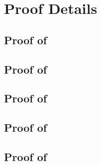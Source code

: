 \section{Proof Details}
\label{app:sec:proof_detail}

\subsection{Proof of }
\label{app:subsec:proof_lemma_r_t_p}


\subsection{Proof of }
\label{app:subsec:proof_lemma_a_b_estimation_error}


\subsection{Proof of }
\label{app:subsec:proof_lemma_r_derivative_estimation_error}


\subsection{Proof of }
\label{app:subsec:proof_lemma_c20_to_performance}


\subsection{Proof of }
\label{app:subsec:proof_lemma_corner_case}


